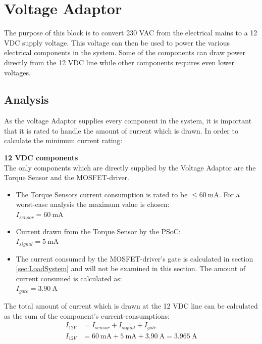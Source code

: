 \section{Voltage Adaptor}
The purpose of this block is to convert 230 VAC from the electrical mains to a 12 VDC supply voltage. This voltage can then be used to power the various electrical components in the system. Some of the components can draw power directly from the 12 VDC line while other components requires even lower voltages.

\subsection{Analysis}
As the voltage Adaptor supplies every component in the system, it is important that it is rated to handle the amount of current which is drawn.
In order to calculate the minimum current rating:

\textbf{12 VDC components}\\
The only components which are directly supplied by the Voltage Adaptor are the Torque Sensor and the MOSFET-driver.

\begin{itemize}
	\item The Torque Sensors current consumption is rated to be $\leq  \SI{60}{\milli \ampere}$. For a worst-case analysis the maximum value is chosen:\\
	$I_{sensor} = \SI{60}{\milli \ampere}$
	\item Current drawn from the Torque Sensor by the PSoC:\\
	$I_{signal} = \SI{5}{\milli \ampere}$
	\item The current consumed by the MOSFET-driver's gate is calculated in section \vref{sec:LoadSystem} and will not be examined in this section. The amount of current consumed is calculated as:\\
	$I_{gate} = \SI{3.90}{\ampere}$
\end{itemize}

The total amount of current which is drawn at the 12 VDC line can be calculated as the sum of the component's current-consumptions:
\begin{equation}
	\begin{split}
		I_{12V} &= I_{sensor} + I_{signal} + I_{gate}\\
		I_{12V} &= \SI{60}{\milli \ampere} + \SI{5}{\milli \ampere} + \SI{3.90}{\ampere} = \SI{3.965}{\ampere}
	\end{split}
\end{equation}

